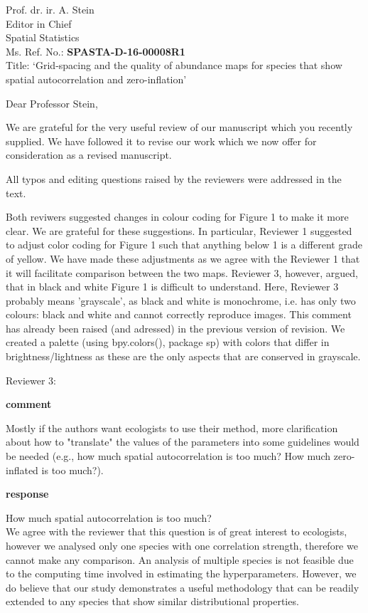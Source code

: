 \documentclass{letter}
\begin{document}
\begin{letter}{
Prof. dr. ir. A. Stein\\
Editor in Chief\\
Spatial Statistics\\
        
\vspace{1cm}
Ms. Ref. No.:  \textbf{SPASTA-D-16-00008R1}\\
Title: `Grid-spacing and the quality of abundance maps for species that show spatial autocorrelation and zero-inflation'
}

\opening{Dear Professor Stein,}

We are grateful for the very useful review of our manuscript which you recently supplied. We have followed it to revise our work which we now offer for consideration as a revised manuscript. 

All typos and editing questions raised by the reviewers were addressed in the text.

Both reviwers suggested changes in colour coding for Figure 1 to make it more clear. We are grateful for these suggestions.
In particular, Reviewer 1 suggested to adjust  color coding for Figure 1 such that anything below 1 is a different grade of yellow. We have made these adjustments as we agree with the Reviewer 1 that it will facilitate comparison between the two maps.  
Reviewer 3, however, argued, that in black and white Figure 1 is difficult to understand. Here, Reviewer 3 probably means 'grayscale', as black and white is monochrome, i.e. has only two colours: black and white and cannot correctly reproduce images. This comment has already been raised (and adressed) in the previous version of revision. We created a palette (using bpy.colors(), package sp) with colors that differ in brightness/lightness as these are the only aspects that are conserved in grayscale. 

Reviewer 3: 

\textbf{comment}

Mostly if the authors want ecologists to use their method, more clarification about how to "translate" the values of the parameters into some guidelines would be needed (e.g., how much spatial autocorrelation is too much? How much zero-inflated is too much?).

\textbf{response}

How much spatial autocorrelation is too much?\\
We agree with the reviewer that this question is of great interest to ecologists, however we analysed only one species with one correlation strength, therefore we cannot make any comparison. An analysis of multiple species is not feasible due to the computing time involved in estimating the hyperparameters. However, we do believe that our study demonstrates a useful methodology that can be readily extended to any species that show similar distributional properties.


\end{letter}
\end{document}
